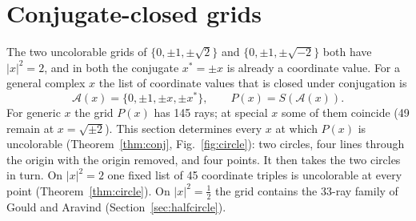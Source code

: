 \section{Conjugate-closed grids}\label{sec:conj}

The two uncolorable grids of $\{0,\pm1,\pm\sqrt2\}$ and $\{0,\pm1,\pm\sqrt{-2}\}$ both have
$|x|^2=2$, and in both the conjugate $x^{*}=\pm x$ is already a coordinate value.  For a general
complex $x$ the list of coordinate values that is closed under conjugation is
\[
\mathcal A(x)=\{0,\pm1,\pm x,\pm x^{*}\},\qquad P(x)=S(\mathcal A(x)).
\]
For generic $x$ the grid $P(x)$ has 145 rays; at special $x$ some of them coincide (49 remain
at $x=\sqrt{\pm2}$).  This section determines every $x$ at which $P(x)$ is uncolorable
(Theorem~\ref{thm:conj}, Fig.~\ref{fig:circle}): two circles, four lines through the origin
with the origin removed, and four points.  It
then takes the two circles in turn.  On $|x|^2=2$ one fixed list of 45 coordinate triples is uncolorable at
every point (Theorem~\ref{thm:circle}).  On $|x|^2=\tfrac12$ the grid contains the 33-ray family
of Gould and Aravind (Section~\ref{sec:halfcircle}).

